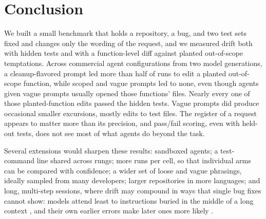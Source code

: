\section{Conclusion}
\label{sec:conclusion}

We built a small benchmark that holds a repository, a bug, and two test sets
fixed and changes only the wording of the request, and we measured drift both
with hidden tests and with a function-level diff against planted
out-of-scope temptations. Across \NConfigsDistinct{} commercial agent configurations
from two model generations, a cleanup-flavored prompt led more than half of
runs to edit a planted out-of-scope function, while scoped and vague prompts
led to none, even though agents given vague prompts usually opened those
functions' files. Nearly every one of those planted-function edits passed the
hidden tests. Vague prompts did produce occasional smaller excursions, mostly
edits to test files. The register of a request
appears to matter more than its precision, and pass/fail scoring, even with
held-out tests, does not see most of what agents do beyond the task.

Several extensions would sharpen these results: sandboxed agents; a
test-command line shared across rungs; more runs per cell, so that
individual arms can be compared with confidence; a wider set of loose and
vague phrasings, ideally sampled from many developers; larger repositories in
more languages; and long, multi-step sessions, where drift may compound in
ways that single bug fixes cannot show: models attend least to instructions
buried in the middle of a long context \citep{liu2024lost}, and their own
earlier errors make later ones more likely \citep{sinha2026illusion}.
